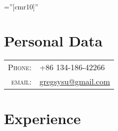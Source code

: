 \documentclass[a4paper,10pt]{article} %
\begin{document}
\pagestyle{empty} %

\font\fb=''[cmr10]'' %


\par{\bigskip\par} %

\section{Personal Data}

\begin{tabular}{rl}
\textsc{Phone:} & +86 134-186-42266\\
\textsc{email:} & \href{mailto:gregsysu@gmail.com}{gregsysu@gmail.com}
\end{tabular}


\section{Experience}
\end{document}
